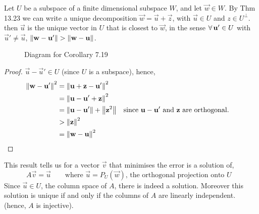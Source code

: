 \documentclass{article}
\begin{document}
\begin{ncor}
  Let $U$ be a subspace of a finite dimensional subspace $W$, and let $\vec w\in W$. By Thm 13.23 we can write a unique decomposition $\vec w = \vec u + \vec z$, with $\vec u \in U$ and $z\in U^\bot$. then $\vec u$ is the unique vector in $U$ that is closest to $\vec w$, in the sense $\forall\, \boldsymbol{\mathbf{u}}'\in U$ with $\vec u' \ne \vec u$, $\left\lVert \boldsymbol{\mathbf{w}} - \boldsymbol{\mathbf{u}}'\right\rVert > \left\lVert \boldsymbol{\mathbf{w}} - \boldsymbol{\mathbf{u}}\right\rVert$.
\end{ncor}

\begin{figure}[!ht]
  \centering
  \caption{Diagram for Corollary 7.19}
  \label{fig:Cor1327}
\end{figure}

\begin{proof}
  $\vec u - \vec u' \in U$ (since $U$ is a subspace), hence,
  \begin{align*}
    \left\lVert \boldsymbol{\mathbf{w}} - \boldsymbol{\mathbf{u}}'\right\rVert^2 &= \left\lVert \boldsymbol{\mathbf{u}} + \boldsymbol{\mathbf{z}} - \boldsymbol{\mathbf{u}}'\right\rVert^2\\
    &= \left\lVert \boldsymbol{\mathbf{u}} - \boldsymbol{\mathbf{u}}' + \boldsymbol{\mathbf{z}}\right\rVert^2\\
    &= \left\lVert \boldsymbol{\mathbf{u}} - \boldsymbol{\mathbf{u}}'\right\rVert + \left\lVert \boldsymbol{\mathbf{z}}^2\right\rVert && \text{since $\boldsymbol{\mathbf{u}} - \boldsymbol{\mathbf{u}}'$ and $\boldsymbol{\mathbf{z}}$ are orthogonal.}\\
    &> \left\lVert \boldsymbol{\mathbf{z}}\right\rVert^2\\
    &= \left\lVert \boldsymbol{\mathbf{w}} - \boldsymbol{\mathbf{u}}\right\rVert^2
  \end{align*}
\end{proof}

This result tells us for a vector $\vec v$ that minimises the error is a solution of,
$$ A\vec v = \vec u \qquad \text{where $\vec u = P_U(\vec w)$, the orthogonal projection onto $U$ } $$
Since $\vec u \in U$, the column space of $A$, there is indeed a solution. Moreover this solution is unique if and only if the columns of $A$ are linearly independent. (hence, $A$ is injective).\\
\end{document}

